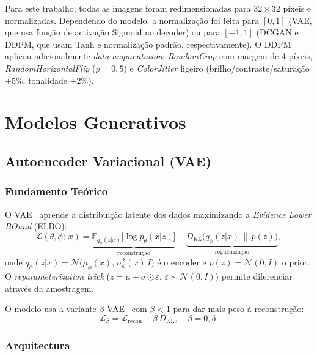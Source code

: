 \documentclass[12pt,a4paper]{article}
\begin{document}
Para este trabalho, todas as imagens foram redimensionadas para $32\times32$ píxeis
e normalizadas. Dependendo do modelo, a normalização foi feita para $[0, 1]$
(VAE, que usa função de activação Sigmoid no decoder) ou para $[-1, 1]$
(DCGAN e DDPM, que usam Tanh e normalização padrão, respectivamente).
O DDPM aplicou adicionalmente \textit{data augmentation}: \textit{RandomCrop}
com margem de 4 píxeis, \textit{RandomHorizontalFlip} ($p=0{,}5$) e
\textit{ColorJitter} ligeiro (brilho/contraste/saturação $\pm5\%$, tonalidade $\pm2\%$).

\section{Modelos Generativos}

\subsection{Autoencoder Variacional (VAE)}

\subsubsection*{Fundamento Teórico}

O VAE~\cite{kingma2013vae} aprende a distribuição latente dos dados maximizando
a \textit{Evidence Lower BOund} (ELBO):
\begin{equation}
  \mathcal{L}(\theta, \phi;\, x) =
    \underbrace{\mathbb{E}_{q_\phi(z|x)}\bigl[\log p_\theta(x|z)\bigr]}_{\text{reconstrução}}
    - \underbrace{D_{\mathrm{KL}}\bigl(q_\phi(z|x)\,\|\,p(z)\bigr)}_{\text{regularização}},
\end{equation}
onde $q_\phi(z|x) = \mathcal{N}\bigl(\mu_\phi(x),\,\sigma^2_\phi(x)\,I\bigr)$
é o encoder e $p(z) = \mathcal{N}(0, I)$ o prior.
O \textit{reparameterization trick} ($z = \mu + \sigma \odot \varepsilon$,
$\varepsilon \sim \mathcal{N}(0,I)$) permite diferenciar através da amostragem.

O modelo usa a variante $\beta$-VAE~\cite{higgins2017betavae} com $\beta < 1$
para dar mais peso à reconstrução:
\begin{equation}
  \mathcal{L}_\beta = \mathcal{L}_{\mathrm{recon}} - \beta\,D_{\mathrm{KL}},
  \quad \beta = 0{,}5.
\end{equation}

\subsubsection*{Arquitectura}
\end{document}
